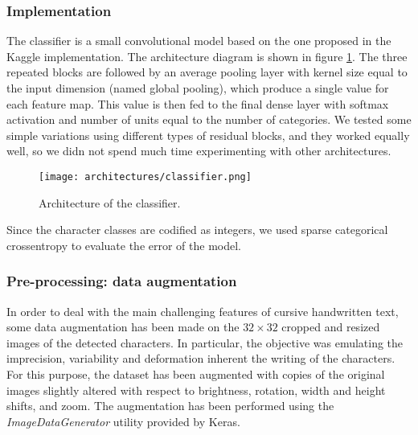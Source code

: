 \subsubsection{Implementation}
\label{sssec:implementationclass}

\label{ssssec:networkarchitectureclass}

The classifier is a small convolutional model based on the one proposed in the Kaggle implementation. The architecture diagram is shown in figure \ref{fig:classifier}. The three repeated blocks are followed by an average pooling layer with kernel size equal to the input dimension (named global pooling), which produce a single value for each feature map. This value is then fed to the final dense layer with softmax activation and number of units equal to the number of categories. We tested some simple variations using different types of residual blocks, and they worked equally well, so we didn not spend much time experimenting with other architectures.

\begin{figure}[h]
	\caption{Architecture of the classifier.}
	\centering
	\texttt{[image: architectures/classifier.png]}
	\label{fig:classifier}
\end{figure}

\label{ssssec:lossfunctionclass}

Since the character classes are codified as integers, we used sparse categorical crossentropy to evaluate the error of the model. 

\subsubsection{Pre-processing: data augmentation}
\label{sssec:preprocessingclass}

In order to deal with the main challenging features of cursive handwritten text, some data augmentation has been made on the $32 \times 32$ cropped and resized images of the detected characters. In particular, the objective was emulating the imprecision, variability and deformation inherent the writing of the characters. For this purpose, the dataset has been augmented with copies of the original images slightly altered with respect to brightness, rotation, width and height shifts, and zoom. The augmentation has been performed using the \textit{ImageDataGenerator} utility provided by Keras.